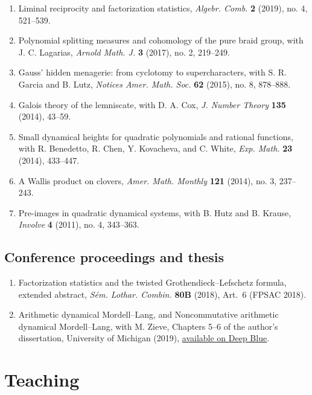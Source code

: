 \documentclass[11pt,letterpaper]{article}
\begin{document}
\begin{enumerate}[resume]
    \item Liminal reciprocity and factorization statistics, \emph{Algebr. Comb.} \textbf{2} (2019), no. 4, 521--539.
    \item Polynomial splitting measures and cohomology of the pure braid group, with J. C. Lagarias, \emph{Arnold Math. J.} \textbf{3} (2017), no. 2, 219--249.
    \item Gauss' hidden menagerie: from cyclotomy to supercharacters, with S. R. Garcia and B. Lutz, \emph{Notices Amer. Math. Soc.} \textbf{62} (2015), no. 8, 878--888.
    \item Galois theory of the lemniscate, with D. A. Cox, \emph{J. Number Theory} \textbf{135} (2014), 43--59.
    \item Small dynamical heights for quadratic polynomials and rational functions, with R. Benedetto, R. Chen, Y. Kovacheva, and C. White, \emph{Exp. Math.} \textbf{23} (2014), 433--447.
    \item A Wallis product on clovers, \emph{Amer. Math. Monthly} \textbf{121} (2014), no. 3, 237--243.
    \item Pre-images in quadratic dynamical systems, with B. Hutz and B. Krause, \emph{Involve} \textbf{4} (2011), no. 4, 343--363.
\end{enumerate}

\subsection{Conference proceedings and thesis}
\begin{enumerate}[resume]
    \item Factorization statistics and the twisted Grothendieck--Lefschetz formula, extended abstract, \emph{S\'em. Lothar. Combin.} \textbf{80B} (2018), Art.\ 6 (FPSAC 2018).
    \item Arithmetic dynamical Mordell--Lang, and Noncommutative arithmetic dynamical Mordell--Lang, with M. Zieve, Chapters 5--6 of the author's dissertation, University of Michigan (2019), \href{https://deepblue.lib.umich.edu/handle/2027.42/151684}{available on Deep Blue}.
\end{enumerate}

\section{Teaching}
\end{document}
